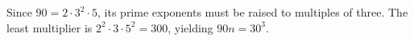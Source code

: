Since $90=2\cdot3^2\cdot5$, its prime exponents must be raised to multiples of three. The least multiplier is $2^2\cdot3\cdot5^2=\boxed{300}$, yielding $90n=30^3$.
